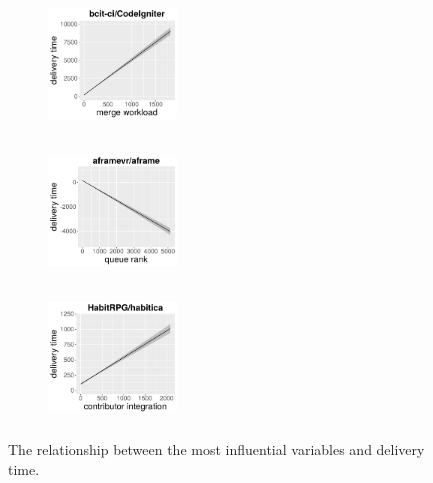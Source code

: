 \begin{figure}[!t]
	\centering
	\begin{subfigure}{3.4cm}
		\includegraphics[width=3.4cm, height=3.4cm]{variable_direction_ci_1.pdf}
		\vspace{-1.7em}
		\caption{}
		\vspace{0.4em}
		\label{fig:merge_workload_direction}
	\end{subfigure}%
	\begin{subfigure}{3.4cm}
		\centering
		\includegraphics[width=3.4cm, height=3.4cm]{variable_direction_ci_2.pdf}
		\vspace{-1.7em}
		\caption{}
		\vspace{0.4em}
		\label{fig:queue_rank_direction}
	\end{subfigure}
	\begin{subfigure}{3.4cm}
		\includegraphics[width=3.4cm, height=3.4cm]{variable_direction_ci_3.pdf}
		\vspace{-1.7em}
		\caption{}
		\label{fig:contributor_integration_direction}
	\end{subfigure}%
	\caption{The relationship between the most influential variables and delivery time.}
	\label{fig:relationship_most_important_variable}
\end{figure}

